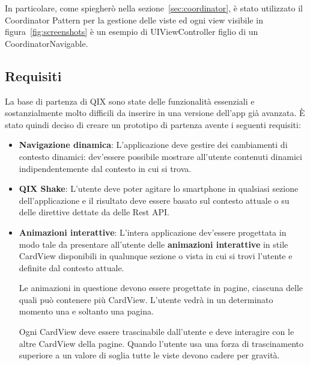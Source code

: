 In particolare, come spiegherò nella sezione~\ref{sec:coordinator}, è stato utilizzato il Coordinator Pattern
per la gestione delle viste ed ogni view visibile in figura~\ref{fig:screenshots} è un esempio di UIViewController
figlio di un CoordinatorNavigable.

\subsection{Requisiti}
La base di partenza di QIX sono state delle funzionalità essenziali e 
sostanzialmente molto difficili da inserire in una versione dell'app già avanzata.
È stato quindi deciso di creare un prototipo di partenza avente i seguenti requisiti:

\begin{itemize}
    \item {
        \textbf{Navigazione dinamica}: L'applicazione deve gestire dei cambiamenti di contesto
        dinamici: dev'essere possibile mostrare all'utente contenuti dinamici indipendentemente
        dal contesto in cui si trova. 
    }
    \item {
        \textbf{QIX Shake}: L'utente deve poter agitare lo smartphone in qualsiasi
        sezione dell'applicazione e il risultato deve essere basato sul contesto attuale o su delle direttive dettate
        da delle Rest API.
    } 
    \item {
        \textbf{Animazioni interattive}: L'intera applicazione dev'essere progettata in modo tale da presentare all'utente
        delle \textbf{animazioni interattive} in stile CardView\cite{cardview} disponibili in 
        qualunque sezione o vista in cui si trovi l'utente e definite dal contesto attuale.

        Le animazioni in questione devono essere progettate in pagine, ciascuna delle quali può contenere 
        più CardView. L'utente vedrà in un determinato momento una e soltanto una pagina.

        Ogni CardView deve essere trascinabile dall'utente e deve interagire con le altre CardView della pagine. 
        Quando l'utente usa una forza di trascinamento superiore a un valore di soglia tutte le viste devono
        cadere per gravità.
        
}
\end{itemize}
